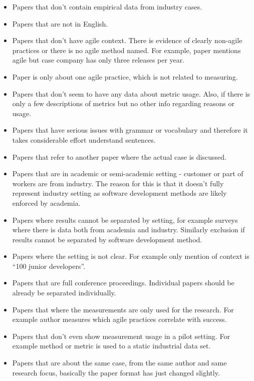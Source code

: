 \documentclass{sig-alternate}
\begin{document}
\begin{itemize}
  \item Papers that don't contain empirical data from industry cases.
  \item Papers that are not in English.
  \item Papers that don't have agile context. There is evidence of
  clearly non-agile practices or there is no agile method named. For example,
  paper mentions agile but case company has only three releases per year.
  \item Paper is only about one agile practice, which is not related to
  measuring.
  \item Papers that don't seem to have any data about metric usage. Also, if
  there is only a few descriptions of metrics but no other info regarding
  reasons or usage.
  \item Papers that have serious issues with grammar or vocabulary and
  therefore it takes considerable effort understand sentences.
  \item Papers that refer to another paper where the actual case is discussed.
  \item Papers that are in academic or semi-academic setting - customer or
  part of workers are from industry. The reason for this is that it doesn't
  fully represent industry setting as software development methods are likely
  enforced by academia.
  \item Papers where results cannot be separated by setting, for example
  surveys where there is data both from academia and industry. Similarly
  exclusion if results cannot be separated by software development method. 
  \item Papers where the setting is not clear. For example only mention of
  context is ``100 junior developers''.
  \item Papers that are full conference proceedings. Individual papers should
  be already be separated individually.
  \item Papers that where the measurements are only used for the research. For
  example author measures which agile practices correlate with success.
  \item Papers that don't even show measurement usage in a pilot setting. For
  example method or metric is used to a static industrial data set.
  \item Papers that are about the same case, from the same author and same
  research focus, basically the paper format has just changed slightly.
\end{itemize}
\end{document}
